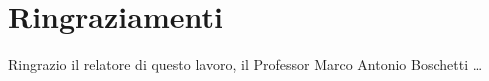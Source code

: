 \clearpage
\chapter*{Ringraziamenti}

Ringrazio il relatore di questo lavoro, il Professor Marco Antonio Boschetti \ldots

\clearpage
